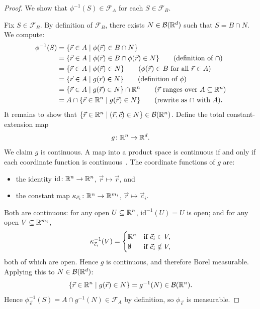 \begin{proof}
	We show that $\phi^{-1}(S) \in \mathcal{F}_A$ for each $S \in \mathcal{F}_B$. 

	Fix $S \in \mathcal{F}_B$. By definition of $\mathcal{F}_B$, there exists
	$N \in \mathcal{B}(\mathbb{R}^d)$ such that $S = B \cap N$. We compute:
    \begin{align*}
        \phi^{-1}(S)
        &= \{\vec{r} \in A \mid \phi(\vec{r}) \in B \cap N\} \\
		&= \{\vec{r} \in A \mid \phi(\vec{r}) \in B \cap \phi(\vec{r}) \in N\} \tag{definition of $\cap$} \\
        &= \{\vec{r} \in A \mid \phi(\vec{r}) \in N\} \tag{$\phi(\vec{r}) \in B$ for all $\vec{r} \in A$}\\
		&= \{\vec{r} \in A \mid g(\vec{r}) \in N\} \tag{definition of $\phi$}\\
		&= \{\vec{r} \in A \mid g(\vec{r}) \in N\} \cap \R^n \tag{$\vec{r}$ ranges over $A \subseteq \R^n$}\\
        &= A \cap \{\vec{r} \in \R^n \mid g(\vec{r}) \in N\} \tag{rewrite as $\cap$ with $A$}.
    \end{align*}
    It remains to show that $\{\vec{r} \in \mathbb{R}^n \mid (\vec{r},\vec{c}) \in N\} \in \mathcal{B}(\mathbb{R}^n)$.
    Define the total constant-extension map
    \[
        g \colon \mathbb{R}^n \to \mathbb{R}^d.
    \]
    We claim $g$ is continuous. A map into a product space is continuous if and only
    if each coordinate function is continuous~\cite[Theorem~19.6]{Munkres2000Topology}. The coordinate functions of $g$ are:
    \begin{itemize}
        \item the identity $\mathrm{id} \colon \mathbb{R}^n \to \mathbb{R}^n$, $\vec{r} \mapsto \vec{r}$, and
        \item the constant map $\kappa_{\vec{c}_i} \colon \mathbb{R}^n \to \mathbb{R}^{m_i}$, $\vec{r} \mapsto \vec{c}_i$.
    \end{itemize}
    Both are continuous: for any open $U \subseteq \mathbb{R}^n$, $\mathrm{id}^{-1}(U) = U$ is open;
    and for any open $V \subseteq \mathbb{R}^{m_i}$,
    \[
        \kappa_{\vec{c}_i}^{-1}(V) =
        \begin{cases} \mathbb{R}^n & \text{if } \vec{c}_i \in V, \\ \emptyset & \text{if } \vec{c}_i \notin V, \end{cases}
    \]
    both of which are open. Hence $g$ is continuous, and therefore Borel measurable.
    Applying this to $N \in \mathcal{B}(\mathbb{R}^d)$:
    \[
        \{\vec{r} \in \mathbb{R}^n \mid g(\vec{r}) \in N\}
        = g^{-1}(N) \in \mathcal{B}(\mathbb{R}^n).
    \]
    Hence $\phi_{\vec{c}}^{-1}(S) = A \cap g^{-1}(N) \in \mathcal{F}_A$
    by definition, so $\phi_{\vec{c}}$ is measurable.
\end{proof}

